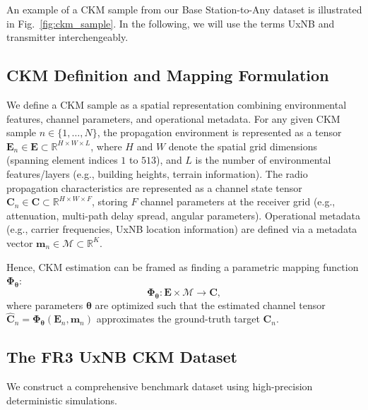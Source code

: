 \documentclass[10pt,conference,letterpaper]{IEEEtran}
\begin{document}
An example of a CKM sample from our Base Station-to-Any dataset is illustrated in Fig.~\ref{fig:ckm_sample}. In the following, we will use the terms UxNB and transmitter interchengeably.

\subsection{CKM Definition and Mapping Formulation}
\label{sec:ckm_def}
We define a CKM sample as a spatial representation combining environmental features, channel parameters, and operational metadata. For any given CKM sample $n \in \{1, \dots, N\}$, the propagation environment is represented as a tensor $\mathbf{E}_n \in \mathbf{E} \subset \mathbb{R}^{H \times W \times L}$, where $H$ and $W$ denote the spatial grid dimensions (spanning element indices $1$ to $513$), and $L$ is the number of environmental features/layers (e.g., building heights, terrain information). The radio propagation characteristics are represented as a channel state tensor $\mathbf{C}_n \in \mathbf{C} \subset \mathbb{R}^{H \times W \times F}$, storing $F$ channel parameters at the receiver grid (e.g., attenuation, multi-path delay spread, angular parameters). Operational metadata (e.g., carrier frequencies, UxNB location information) are defined via a metadata vector $\mathbf{m}_n \in \mathcal{M} \subset \mathbb{R}^K$.

Hence, CKM estimation can be framed as finding a parametric mapping function $\mathbf{\Phi}_{\boldsymbol{\theta}}$:
\begin{equation}
\mathbf{\Phi}_{\boldsymbol{\theta}} : \mathbf{E} \times \mathcal{M} \to \mathbf{C},
\label{eq:mapping_generic}
\end{equation}
where parameters $\boldsymbol{\theta}$ are optimized such that the estimated channel tensor $\widehat{\mathbf{C}}_n = \mathbf{\Phi}_{\boldsymbol{\theta}}(\mathbf{E}_n, \mathbf{m}_n)$ approximates the ground-truth target $\mathbf{C}_n$.

\subsection{The FR3 UxNB CKM Dataset}
\label{sec:dataset_details}
We construct a comprehensive benchmark dataset using high-precision deterministic simulations.
\end{document}
